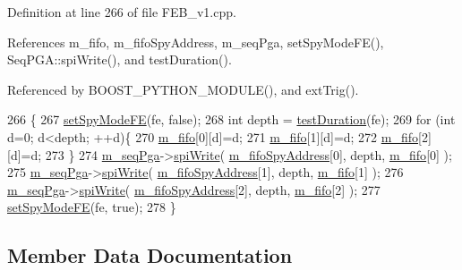 Definition at line 266 of file F\+E\+B\+\_\+v1.\+cpp.



References m\+\_\+fifo, m\+\_\+fifo\+Spy\+Address, m\+\_\+seq\+Pga, set\+Spy\+Mode\+F\+E(), Seq\+P\+G\+A\+::spi\+Write(), and test\+Duration().



Referenced by B\+O\+O\+S\+T\+\_\+\+P\+Y\+T\+H\+O\+N\+\_\+\+M\+O\+D\+U\+L\+E(), and ext\+Trig().


\begin{DoxyCode}
266                                   \{
267   \hyperlink{classFEB__v1_ab88d23abb96f746298e0fa1e1cf63e3e}{setSpyModeFE}(fe, \textcolor{keyword}{false});
268   \textcolor{keywordtype}{int} depth = \hyperlink{classFEB__v1_a7f1db8ca9490172fce7603da9e703dec}{testDuration}(fe);
269   \textcolor{keywordflow}{for} (\textcolor{keywordtype}{int} d=0; d<depth; ++d)\{
270     \hyperlink{classFEB__v1_ae5b770f2f5ffb97324862c93e3153985}{m\_fifo}[0][d]=d;
271     \hyperlink{classFEB__v1_ae5b770f2f5ffb97324862c93e3153985}{m\_fifo}[1][d]=d;
272     \hyperlink{classFEB__v1_ae5b770f2f5ffb97324862c93e3153985}{m\_fifo}[2][d]=d; 
273   \}
274   \hyperlink{classFEB__v1_a6c7804ac86796f233a8393043adf2e77}{m\_seqPga}->\hyperlink{classSeqPGA_ad4421841ce4ce8b88ad13f63216f0743}{spiWrite}( \hyperlink{classFEB__v1_a15b48648ba4534e732376b68bddc5d34}{m\_fifoSpyAddress}[0], depth, 
      \hyperlink{classFEB__v1_ae5b770f2f5ffb97324862c93e3153985}{m\_fifo}[0] );
275   \hyperlink{classFEB__v1_a6c7804ac86796f233a8393043adf2e77}{m\_seqPga}->\hyperlink{classSeqPGA_ad4421841ce4ce8b88ad13f63216f0743}{spiWrite}( \hyperlink{classFEB__v1_a15b48648ba4534e732376b68bddc5d34}{m\_fifoSpyAddress}[1], depth, 
      \hyperlink{classFEB__v1_ae5b770f2f5ffb97324862c93e3153985}{m\_fifo}[1] );
276   \hyperlink{classFEB__v1_a6c7804ac86796f233a8393043adf2e77}{m\_seqPga}->\hyperlink{classSeqPGA_ad4421841ce4ce8b88ad13f63216f0743}{spiWrite}( \hyperlink{classFEB__v1_a15b48648ba4534e732376b68bddc5d34}{m\_fifoSpyAddress}[2], depth, 
      \hyperlink{classFEB__v1_ae5b770f2f5ffb97324862c93e3153985}{m\_fifo}[2] );
277   \hyperlink{classFEB__v1_ab88d23abb96f746298e0fa1e1cf63e3e}{setSpyModeFE}(fe, \textcolor{keyword}{true});
278 \}
\end{DoxyCode}


\subsection{Member Data Documentation}
\mbox{\label{classFEB__v1_a383c35f10769b16c6a719494594899c6}} 
